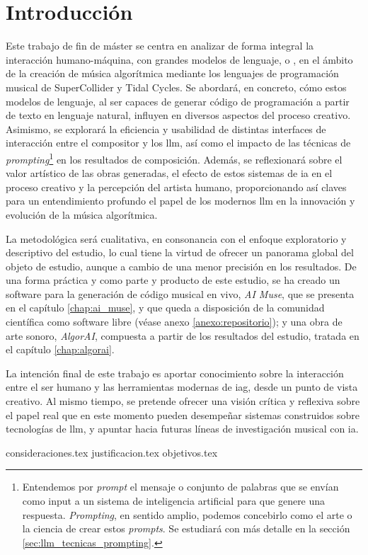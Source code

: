 \chapter{Introducción}



Este trabajo de fin de máster se centra en analizar de forma integral la interacción humano-máquina, con grandes modelos de lenguaje, o , en el ámbito de la creación de música algorítmica mediante los lenguajes de programación musical de SuperCollider y Tidal Cycles. Se abordará, en concreto, cómo estos modelos de lenguaje, al ser capaces de generar código de programación a partir de texto en lenguaje natural, influyen en diversos aspectos del proceso creativo. Asimismo, se explorará la eficiencia y usabilidad de distintas interfaces de interacción entre el compositor y los \gls{llm}, así como el impacto de las técnicas de \emph{prompting}\footnote{Entendemos por \emph{prompt} el mensaje o conjunto de palabras que se envían como input a un sistema de inteligencia artificial para que genere una respuesta. \emph{Prompting}, en sentido amplio, podemos concebirlo como el arte o la ciencia de crear estos \emph{prompts}. Se estudiará con más detalle en la sección \ref{sec:llm_tecnicas_prompting}.} en los resultados de composición. Además, se reflexionará sobre el valor artístico de las obras generadas, el efecto de estos sistemas de \gls{ia} en el proceso creativo y la percepción del artista humano, proporcionando así claves para un entendimiento profundo el papel de los modernos \gls{llm} en la innovación y evolución de la música algorítmica.

La metodológica será cualitativa, en consonancia con el enfoque exploratorio y descriptivo del estudio, lo cual tiene la virtud de ofrecer un panorama global del objeto de estudio, aunque a cambio de una menor precisión en los resultados. De una forma práctica y como parte y producto de este estudio, se ha creado un software para la generación de código musical en vivo, \emph{AI Muse}, que se presenta en el capítulo \ref{chap:ai_muse}, y que queda a disposición de la comunidad científica como software libre (véase anexo \ref{anexo:repositorio}); y una obra de arte sonoro, \emph{AlgorAI}, compuesta a partir de los resultados del estudio, tratada en el capítulo \ref{chap:algorai}.

La intención final de este trabajo es aportar conocimiento sobre la interacción entre el ser humano y las herramientas modernas de \gls{iag}, desde un punto de vista creativo. Al mismo tiempo, se pretende ofrecer una visión crítica y reflexiva sobre el papel real que en este momento pueden desempeñar sistemas construidos sobre tecnologías de \gls{llm}, y apuntar hacia futuras líneas de investigación musical con \gls{ia}.



{consideraciones.tex}
{justificacion.tex}
{objetivos.tex}